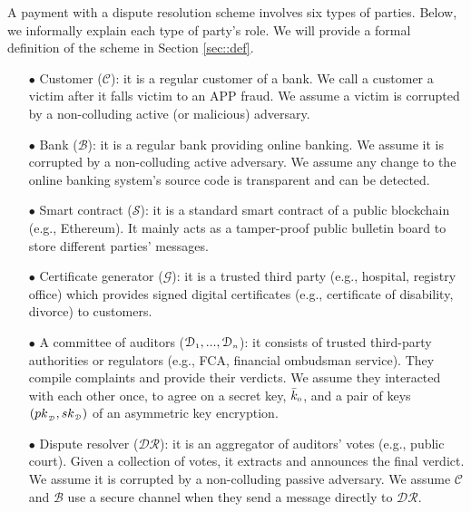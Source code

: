 A payment with a dispute resolution scheme involves six types of parties. Below, we informally explain each type of party's role. 
%
%
We will provide a formal definition of the scheme in Section \ref{sec::def}. 
%
\begin{itemize}[leftmargin=3.8mm]
%

\item[$\bullet$] Customer ($\mathcal{C}$): it is a regular customer of a bank. We call a customer a victim after it falls victim to an APP fraud. We assume a victim is corrupted by a non-colluding active (or malicious) adversary. %
%
\item[$\bullet$] Bank ($\mathcal{B}$): it is a regular bank providing online banking. We assume it is corrupted by a non-colluding active adversary. We assume any change to the online banking system's source code is transparent and can be detected. 


%
\item[$\bullet$] Smart contract ($\mathcal{S}$): it is a standard smart contract of a public blockchain (e.g., Ethereum). It mainly acts as a tamper-proof public bulletin board to store different parties' messages.  %
%
\item[$\bullet$] Certificate generator ($\mathcal{G}$): it is a trusted third party (e.g., hospital, registry office) which provides signed digital certificates (e.g., certificate of disability, divorce) to customers. %
%
\item[$\bullet$]  A committee of auditors ($\mathcal{D}_{\scriptscriptstyle 1},..., \mathcal{D}_{\scriptscriptstyle n}$): it consists of trusted third-party authorities or regulators (e.g.,  FCA, financial ombudsman service). They compile complaints and provide their verdicts.
%
 We assume they   interacted with each  other once,  to agree on a secret key, $\bar k_{\scriptscriptstyle 0}$, and a pair of keys $({pk}_{\scriptscriptstyle\mathcal {D}}, {sk}_{\scriptscriptstyle\mathcal {D}})$  of an asymmetric key encryption.
%
\item[$\bullet$]  Dispute resolver ($\mathcal{DR}$): it is an aggregator of auditors' votes (e.g., public court). Given a collection of votes, it extracts and announces the final verdict. We assume it is corrupted by a non-colluding passive adversary. We assume $\mathcal C$ and $\mathcal B$  use a secure channel when they send a message directly to $\mathcal{DR}$. 
%
\end{itemize}



